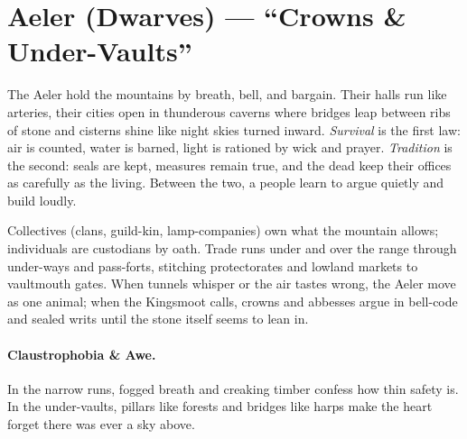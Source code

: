 \section{Aeler (Dwarves) --- ``Crowns \& Under-Vaults''}
\label{chap:aeler}

The Aeler hold the mountains by breath, bell, and bargain. Their halls run like arteries, their cities open in thunderous caverns where bridges leap between ribs of stone and cisterns shine like night skies turned inward. \textit{Survival} is the first law: air is counted, water is barned, light is rationed by wick and prayer. \textit{Tradition} is the second: seals are kept, measures remain true, and the dead keep their offices as carefully as the living. Between the two, a people learn to argue quietly and build loudly.

Collectives (clans, guild-kin, lamp-companies) own what the mountain allows; individuals are custodians by oath. Trade runs under and over the range through under-ways and pass-forts, stitching protectorates and lowland markets to vaultmouth gates. When tunnels whisper or the air tastes wrong, the Aeler move as one animal; when the Kingsmoot calls, crowns and abbesses argue in bell-code and sealed writs until the stone itself seems to lean in.

\paragraph{Claustrophobia \& Awe.} In the narrow runs, fogged breath and creaking timber confess how thin safety is. In the under-vaults, pillars like forests and bridges like harps make the heart forget there was ever a sky above.


